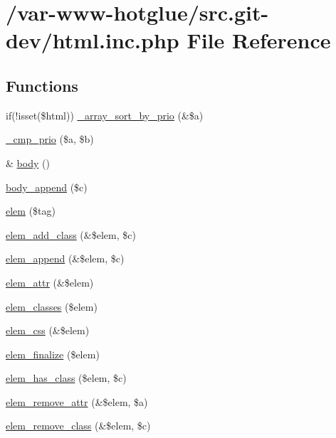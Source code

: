 \hypertarget{html_8inc_8php}{
\section{/var-\/www-\/hotglue/src.git-\/dev/html.inc.php File Reference}
\label{html_8inc_8php}
}
\subsection*{Functions}
\begin{DoxyCompactItemize}
\item 
if(!isset(\$html)) \hyperlink{html_8inc_8php_a7fb2b386b2bae219112628971275c225}{\_\-array\_\-sort\_\-by\_\-prio} (\&\$a)
\item 
\hyperlink{html_8inc_8php_af8ecadff0a4b78867d4da5eae49615e1}{\_\-cmp\_\-prio} (\$a, \$b)
\item 
\& \hyperlink{html_8inc_8php_a8b842636055e9a5853a7a10a9e002330}{body} ()
\item 
\hyperlink{html_8inc_8php_ad27881abf3a2004d287434d8c8d7cdf6}{body\_\-append} (\$c)
\item 
\hyperlink{html_8inc_8php_aa7a1256f84f937f1656195d5ce7b8d91}{elem} (\$tag)
\item 
\hyperlink{html_8inc_8php_aafa12d2b690751666e599fb052e19ca6}{elem\_\-add\_\-class} (\&\$elem, \$c)
\item 
\hyperlink{html_8inc_8php_aea37c451f5d55e2efbb2656e340c1dae}{elem\_\-append} (\&\$elem, \$c)
\item 
\hyperlink{html_8inc_8php_a894dc22f3b7668c59364599909162b8e}{elem\_\-attr} (\&\$elem)
\item 
\hyperlink{html_8inc_8php_a821651b8923938645b0b0fa6bb084522}{elem\_\-classes} (\$elem)
\item 
\hyperlink{html_8inc_8php_ac705ef06deb9e2d49e342ed78ecc1c9a}{elem\_\-css} (\&\$elem)
\item 
\hyperlink{html_8inc_8php_af04b43a4dd09e73ca2cef84a4f2e9381}{elem\_\-finalize} (\$elem)
\item 
\hyperlink{html_8inc_8php_ab1019c4b75181c1c1af10e1c1e5e197d}{elem\_\-has\_\-class} (\$elem, \$c)
\item 
\hyperlink{html_8inc_8php_aeb7074172d9164f69e64967b6bcdc643}{elem\_\-remove\_\-attr} (\&\$elem, \$a)
\item 
\hyperlink{html_8inc_8php_a6a224914e8f32176ca11a31154b1ae13}{elem\_\-remove\_\-class} (\&\$elem, \$c)
\item 

\end{DoxyCompactItemize}
